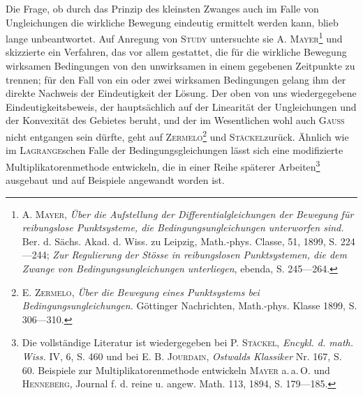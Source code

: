Die Frage, ob durch das Prinzip des kleinsten Zwanges auch im Falle
von Ungleichungen die wirkliche Bewegung eindeutig ermittelt werden kann,
blieb lange unbeantwortet. Auf Anregung von \textsc{Study} untersuchte sie A. \textsc{Mayer}\footnote{A. \textsc{Mayer}, \textit{Über die Aufstellung der Differentialgleichungen der Bewegung für reibungslose Punktsysteme,
die Bedingungsungleichungen unterworfen sind.} Ber. d. Sächs. Akad. d. Wiss. zu Leipzig, Math.-phys.
Classe, 51, 1899, S. 224—244; \textit{Zur Regulierung der Stösse in reibungslosen Punktsystemen, die dem
Zwange von Bedingungsungleichungen unterliegen}, ebenda, S. 245—264.}
und skizzierte ein Verfahren, das vor allem gestattet, die für die wirkliche
\clearpage{}
\noindent Bewegung wirksamen Bedingungen von den unwirksamen in einem gegebenen
Zeitpunkte zu trennen; für den Fall von ein oder zwei wirksamen Bedingungen
gelang ihm der direkte Nachweis der Eindeutigkeit der Lösung. Der
oben von uns wiedergegebene Eindeutigkeitsbeweis, der hauptsächlich auf der
Linearität der Ungleichungen und der Konvexität des Gebietes beruht, und
der im Wesentlichen wohl auch \textsc{Gauss} nicht entgangen sein dürfte, geht auf
\textsc{Zermelo}\footnote{E. \textsc{Zermelo}, \textit{Über die Bewegung eines Punktsystems bei Bedingungsungleichungen.} Göttinger
Nachrichten, Math.-phys. Klasse 1899, S. 306—310.} und \textsc{Stäckel}\footnotemark[55] zurück. Ähnlich wie im \textsc{Lagrange}schen Falle der
Bedingungsgleichungen lässt sich eine modifizierte Multiplikatorenmethode entwickeln,
die in einer Reihe späterer Arbeiten\footnote{Die vollständige Literatur ist wiedergegeben bei P. \textsc{Stäckel}, \textit{Encykl. d. math. Wiss.} IV, 6,
S. 460 und bei E. B. \textsc{Jourdain}, \textit{Ostwalds Klassiker} Nr. 167, S. 60. Beispiele zur Multiplikatorenmethode
entwickeln \textsc{Mayer} a.\,a.\,O. und \textsc{Henneberg}, Journal f. d. reine u. angew. Math. 113, 1894, S. 179—185.} ausgebaut und auf Beispiele
angewandt worden ist.
\clearpage\endgroup
